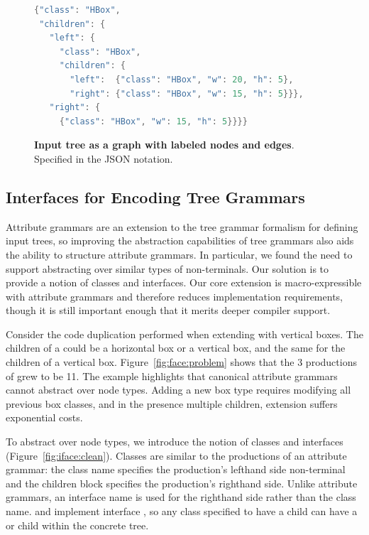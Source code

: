 \begin{figure}
\centering
\begin{minipage}{0.8\columnwidth}
\begin{lstlisting}[language=C++,morekeywords={spawn,join,reverse,parallel_for}]
{"class": "HBox",
 "children": {
   "left": {
     "class": "HBox",
     "children": {
       "left":  {"class": "HBox", "w": 20, "h": 5},
       "right": {"class": "HBox", "w": 15, "h": 5}}},
   "right": {
     {"class": "HBox", "w": 15, "h": 5}}}}
\end{lstlisting}
\end{minipage}
\caption{\textbf{Input tree as a graph with labeled nodes and edges}. Specified in the JSON notation.}
\label{fig:hboxjson}
\end{figure}

\subsection{Interfaces for Encoding Tree Grammars}
Attribute grammars are an extension to the tree grammar formalism for defining input trees, so improving the abstraction capabilities of tree grammars also aids the ability to structure attribute grammars. In particular, we found the need to support  abstracting over similar types of non-terminals. Our solution is to provide a notion of classes and interfaces. Our core extension is macro-expressible with attribute grammars and therefore reduces implementation requirements, though it is still important enough that it merits deeper compiler support. 


Consider the code duplication performed when extending \hlang with vertical boxes. The children of a  could be a horizontal box or a vertical box, and the same for the children of a vertical box. Figure~\ref{fig:face:problem} shows that the 3 productions of \hlang grew to be 11. The example highlights that canonical attribute grammars cannot abstract over node types. Adding a new box type requires modifying all previous box classes, and in the presence multiple children, extension suffers exponential costs. 

To abstract over node types, we introduce the notion of classes and interfaces (Figure~\ref{fig:iface:clean}). Classes are similar to the productions of an attribute grammar: the class name specifies the production's lefthand side non-terminal and the children block specifies the production's righthand side. Unlike attribute grammars, an interface name is used for the righthand side rather than the class name.  and  implement interface , so any class specified to have a  child can have a  or  child within the concrete tree. 


